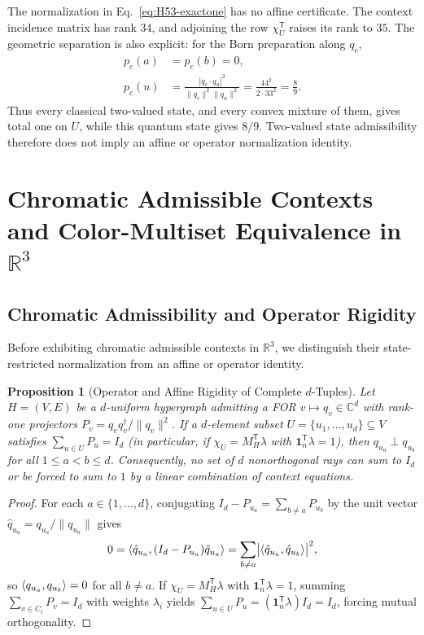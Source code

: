\documentclass[aps,pra,reprint,superscriptaddress,longbibliography,nofootinbib,floatfix,10pt]{revtex4-2}
\newtheorem{proposition}[theorem]{Proposition}
\theoremstyle{definition}\newtheorem{definition}[theorem]{Definition}
\theoremstyle{remark}\newtheorem{remark}[theorem]{Remark}
\newcommand{\C}{\mathbb C}\newcommand{\R}{\mathbb R}\newcommand{\Q}{\mathbb Q}
\begin{document}
The normalization in Eq.~\eqref{eq:H53-exactone} has no affine certificate. The context incidence matrix has rank $34$, and adjoining the row $\chi_U^{\mathsf T}$ raises its rank to $35$. The geometric separation is also explicit: for the Born preparation along $q_c$,
\begin{equation}\label{eq:H53-Born-separation}
\begin{aligned}
p_c(a)&=p_c(b)=0,\\
p_c(u)&=\frac{|q_c\cdot q_u|^2}{\|q_c\|^2\|q_u\|^2}
=\frac{44^2}{2\cdot33^2}=\frac89.
\end{aligned}
\end{equation}
Thus every classical two-valued state, and every convex mixture of them, gives total one on $U$, while this quantum state gives $8/9$. Two-valued state admissibility therefore does not imply an affine or operator normalization identity.


\section{Chromatic Admissible Contexts and Color-Multiset Equivalence in \texorpdfstring{$\R^3$}{R3}}\label{sec:complete-rainbow}

\subsection{Chromatic Admissibility and Operator Rigidity}\label{sec:no-go-operator}

Before exhibiting chromatic admissible contexts in $\R^3$, we distinguish their state-restricted normalization from an affine or operator identity.

\begin{proposition}[Operator and Affine Rigidity of Complete $d$-Tuples]\label{prop:no-operator-complete}
Let $H=(V,E)$ be a $d$-uniform hypergraph admitting a FOR $v\mapsto q_v\in\C^d$ with rank-one projectors $P_v=q_vq_v^\dagger/\|q_v\|^2$. If a $d$-element subset $U=\{u_1,\ldots,u_d\}\subseteq V$ satisfies $\sum_{u\in U}P_u=I_d$ (in particular, if $\chi_U=M_H^{\mathsf T}\lambda$ with $\mathbf{1}_n^{\mathsf T}\lambda=1$), then $q_{u_a}\perp q_{u_b}$ for all $1\le a<b\le d$. Consequently, no set of $d$ nonorthogonal rays can sum to $I_d$ or be forced to sum to $1$ by a linear combination of context equations.
\end{proposition}
\begin{proof}
For each $a\in\{1,\ldots,d\}$, conjugating $I_d-P_{u_a}=\sum_{b\neq a}P_{u_b}$ by the unit vector $\hat{q}_{u_a}=q_{u_a}/\|q_{u_a}\|$ gives
\[
0 = \langle \hat{q}_{u_a},(I_d-P_{u_a})\hat{q}_{u_a}\rangle = \sum_{b\neq a}\bigl|\langle \hat{q}_{u_a},\hat{q}_{u_b}\rangle\bigr|^2,
\]
so $\langle q_{u_a},q_{u_b}\rangle=0$ for all $b\neq a$. If $\chi_U=M_H^{\mathsf T}\lambda$ with $\mathbf{1}_n^{\mathsf T}\lambda=1$, summing $\sum_{v\in C_i}P_v=I_d$ with weights $\lambda_i$ yields $\sum_{u\in U}P_u=(\mathbf{1}_n^{\mathsf T}\lambda)I_d=I_d$, forcing mutual orthogonality.
\end{proof}
\end{document}
